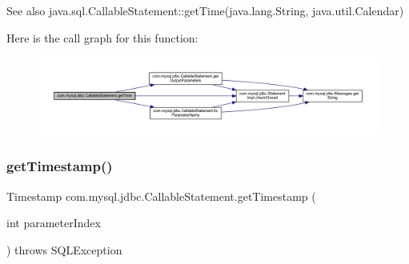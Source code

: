 \begin{DoxySeeAlso}{See also}
java.\+sql.\+Callable\+Statement\+::get\+Time(java.\+lang.\+String, java.\+util.\+Calendar) 
\end{DoxySeeAlso}
Here is the call graph for this function\+:\nopagebreak
\begin{figure}[H]
\begin{center}
\leavevmode
\includegraphics[width=350pt]{classcom_1_1mysql_1_1jdbc_1_1_callable_statement_af552f75778c2ff1df5e7ef47014e5810_cgraph}
\end{center}
\end{figure}
\mbox{\label{classcom_1_1mysql_1_1jdbc_1_1_callable_statement_aa0263246593571a7c5a1caf704ad3eec}} 
\subsubsection{\texorpdfstring{get\+Timestamp()}{getTimestamp()}\hspace{0.1cm}{\footnotesize\ttfamily [1/4]}}
{\footnotesize\ttfamily Timestamp com.\+mysql.\+jdbc.\+Callable\+Statement.\+get\+Timestamp (\begin{DoxyParamCaption}\item[{int}]{parameter\+Index }\end{DoxyParamCaption}) throws S\+Q\+L\+Exception}

